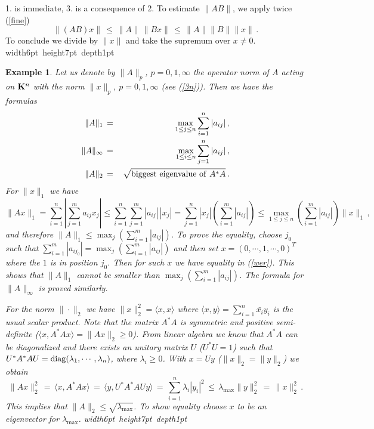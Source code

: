 \documentclass[12pt]{report}
\newcommand{\bK}{{\bf K}}
\newtheorem{example}[theorem]{Example}
\newcommand{\proof}{\noindent {\em Proof:~}}
\newcommand{\nn}{\nonumber}
\def\eqref#1{(\ref{#1})}
\def\qed{\hbox{\hskip 6pt\vrule width6pt height7pt depth1pt
    \hskip1pt}\bigskip}
\begin{document}
\proof 1. is immediate, 3. is a consequence of 2.  To estimate $\|A
B\|$, we apply twice \eqref{fine}
\begin{equation}
\| (AB)x\|\,\le\, \|A\| \,\|Bx\|\,\le\, \|A\| \|B\| \|x\| \,.
\end{equation}
To conclude we divide by $\|x\|$ and take the supremum over $x\not=0$. \qed

\begin{example}{\rm 
 Let us denote by $\|A\|_p$, $p=0,1,\infty$ the operator norm of $A$
 acting on $\bK^n$ with the norm $\|x\|_p$, $p=0,1,\infty$ (see
 \eqref{3n}). Then we have the formulas
 \begin{eqnarray}
 \|A\|_1 \,&=&\, \max_{1\le j \le n}  \sum_{i=1}^n |a_{ij}| \,, \nn \\
 \|A\|_\infty \,&=&\, \max_{1\le i \le n}  \sum_{j=1}^n |a_{ij}| \,, \nn \\
 \|A\|_2\,&=&\, \sqrt{ {\rm biggest~eigenvalue~of~}A^*A} \,.  
  \end{eqnarray}
\proof For $\|x\|_1$ we have 
\begin{equation}\label{wer}
\|Ax\|_1 = \sum_{i=1}^n \left|  \sum_{j=1}^m a_{ij}x_j \right| 
\le \sum_{i=1}^n  \sum_{j=1}^m |a_{ij}|\,|x_j|  = \sum_{j=1}^n |x_j| 
\left( \sum_{i=1}^m |a_{ij}| \right) \le \max_{1\le j \le n} 
\left( \sum_{i=1}^m |a_{ij}| \right)\|x\|_1\,,
\end{equation} 
and therefore $\|A\|_1 \le \max_j (\sum_{i=1}^m |a_{ij}|)$.  To prove
the equality, choose $j_0$ such that $\sum_{i=1}^m |a_{ij_0}| = \max_j
(\sum_{i=1}^m |a_{ij}|)$ and then set $x= (0, \cdots, 1, \cdots, 0)^T$
where the $1$ is in position $j_0$. Then for such $x$ we have equality
in \eqref{wer}. This shows that $\|A\|_1$ cannot be smaller than
$\max_j (\sum_{i=1}^m |a_{ij}|)$.  The formula for $\|A\|_\infty$ is
proved similarly.

For the norm $\| \cdot \|_2$ we have $\| x\|_2^2 = \langle x , x \rangle$
where $\langle x , y\rangle = \sum_{i=1}^n \bar{x_i} y_i $ is the usual scalar product. 
Note that the matrix $A^* A$ is symmetric and positive semi-definite 
($\langle x , A^* A x \rangle = \|Ax\|_2 \ge 0$).  From linear algebra we know 
that $A^*A$ can be diagonalized and there exists an unitary matrix $U$
($U^*U=1$) such that $U^* A^* A U= {\rm diag}(\lambda_1, \cdots,
\lambda_n)$, where $\lambda_i \ge 0$.  With $x=Uy$ ($\|x\|_2=\|y\|_2$) we
obtain
\begin{equation}
\|Ax\|_2^2 \,=\, \langle x , A^* A x \rangle  \,=\, 
\langle y , U^*A^* A U y \rangle \,=\, \sum_{i=1}^n 
\lambda_i |y_i|^2  \,\le\, \lambda_{\max} \|y\|_2^2 \,=\, \|x\|_2^2\,.
\end{equation}
This implies that $\|A\|_2\le \sqrt{\lambda_{\max}}$. To show equality
choose $x$ to be an eigenvector for $\lambda_{\max}$. \hfill \qed
}\end{example}
\end{document}
